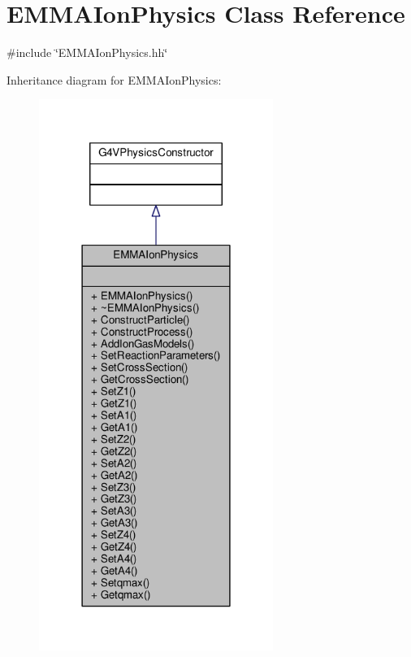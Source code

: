 \hypertarget{classEMMAIonPhysics}{}\section{E\+M\+M\+A\+Ion\+Physics Class Reference}
\label{classEMMAIonPhysics}


{\ttfamily \#include \char`\"{}E\+M\+M\+A\+Ion\+Physics.\+hh\char`\"{}}



Inheritance diagram for E\+M\+M\+A\+Ion\+Physics\+:
\nopagebreak
\begin{figure}[H]
\begin{center}
\leavevmode
\includegraphics[width=216pt]{classEMMAIonPhysics__inherit__graph}
\end{center}
\end{figure}


